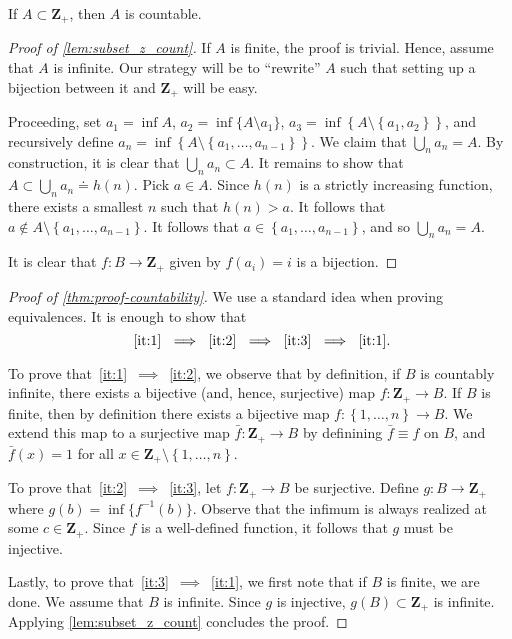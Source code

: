 \begin{lemma}\label{lem:subset_z_count}
If $A \subset \mathbf{Z}_{+}$, then $A$ is countable.
\end{lemma}
\begin{proof}[Proof of \cref{lem:subset_z_count}]
If $A$ is finite, the proof is trivial. Hence, assume that $A$ is infinite.
Our strategy will be to ``rewrite'' $A$ such that setting up a bijection
between it and $\mathbf{Z}_{+}$ will be easy.

Proceeding, set $a_1 = \inf A$, $a_{2} = \inf \{A \setminus {a_{1}}\}$,
$a_{3} = \inf \left\{ A \setminus \left\{ a_{1}, a_{2} \right\} \right\}$,
and recursively define $a_{n} = \inf \left\{ A \setminus \left\{
a_{1}, \dots,
a_{n-1} \right\}\right\}$. We claim that $\bigcup_{n} a_{n} = A$. By
construction, it is clear that $\bigcup_{n} a_{n} \subset A$. It remains to show
that $A \subset \bigcup_{n} a_{n} \doteq h(n)$. Pick $a \in A$. Since
$h(n)$ is a strictly increasing function, there exists a smallest $n$ such that
$h(n) > a$. It follows that
$a \not \in A \setminus\left\{ a_{1}, \dots, a_{n-1} \right\}$. It follows that
$a \in \left\{ a_{1}, \dots, a_{n-1} \right\}$, and so
$\bigcup_{n} a_{n} = A$.

It is clear that $f: B \to
\mathbf{Z}_{+}$ given by $f(a_{i}) = i$ is a bijection.

\end{proof}

\begin{proof}[Proof of \cref{thm:proof-countability}]
We use a standard idea when proving equivalences. It is enough to show that
\[~\eqref{it:1}~\implies~\eqref{it:2}~\implies~\eqref{it:3}~\implies~\eqref{it:1}.\]

To prove that~\eqref{it:1}~$\implies$~\eqref{it:2}, we observe that by
definition, if $B$ is countably infinite, there exists a bijective
(and, hence, surjective) map  $f: \mathbf{Z}_{+} \to B$.
If $B$ is finite, then by definition there exists a bijective map
$f: \left\{ 1, \dots, n \right\} \to B$. We extend this map to a surjective
map $\bar{f}: \mathbf{Z}_{+} \to B$ by definining $\bar{f} \equiv f$ on $B$,
and $\bar{f}(x) = 1$ for all $x \in \mathbf{Z}_{+} \setminus \left\{ 1, \dots, n
\right\}$.

To prove that~\eqref{it:2}~$\implies$~\eqref{it:3}, let
$f:\mathbf{Z}_{+} \to B$ be surjective. Define $g: B \to \mathbf{Z}_{+}$
where $g(b) = \inf \{f^{-1}(b) \}$. Observe that the infimum is always
realized at some $c \in \mathbf{Z}_{+}$. Since $f$ is a well-defined
function, it follows that $g$ must be injective.

Lastly, to prove that~\eqref{it:3}~$\implies$~\eqref{it:1}, we first note that
if $B$ is finite, we are done. We assume that $B$ is infinite. Since $g$ is
injective, $g(B) \subset \mathbf{Z}_{+}$ is infinite. Applying
\cref{lem:subset_z_count} concludes the proof.

\end{proof}

